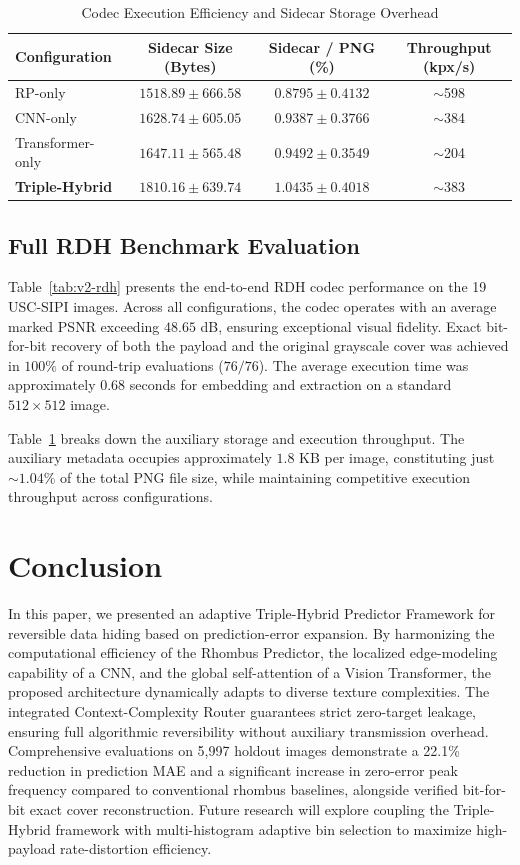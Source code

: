 \documentclass[conference]{IEEEtran}
\begin{document}
\begin{table}[!t]
\centering
\caption{Codec Execution Efficiency and Sidecar Storage Overhead}
\label{tab:overhead}
\footnotesize
\setlength{\tabcolsep}{5pt}
\begin{tabular}{lccc}
\toprule
\textbf{Configuration} & \textbf{Sidecar Size (Bytes)} & \textbf{Sidecar / PNG (\%)} & \textbf{Throughput (kpx/s)} \\
\midrule
RP-only & $1518.89 \pm 666.58$ & $0.8795 \pm 0.4132$ & $\sim$598 \\
CNN-only & $1628.74 \pm 605.05$ & $0.9387 \pm 0.3766$ & $\sim$384 \\
Transformer-only & $1647.11 \pm 565.48$ & $0.9492 \pm 0.3549$ & $\sim$204 \\
\textbf{Triple-Hybrid} & $1810.16 \pm 639.74$ & $1.0435 \pm 0.4018$ & $\sim$383 \\
\bottomrule
\end{tabular}
\end{table}

\subsection{Full RDH Benchmark Evaluation}
Table~\ref{tab:v2-rdh} presents the end-to-end RDH codec performance on the 19 USC-SIPI images. Across all configurations, the codec operates with an average marked PSNR exceeding $48.65$ dB, ensuring exceptional visual fidelity. Exact bit-for-bit recovery of both the payload and the original grayscale cover was achieved in $100\%$ of round-trip evaluations ($76/76$). The average execution time was approximately $0.68$ seconds for embedding and extraction on a standard $512 \times 512$ image.

Table~\ref{tab:overhead} breaks down the auxiliary storage and execution throughput. The auxiliary metadata occupies approximately $1.8$ KB per image, constituting just $\sim 1.04\%$ of the total PNG file size, while maintaining competitive execution throughput across configurations.

\section{Conclusion}
\label{sec:conclusion}
In this paper, we presented an adaptive Triple-Hybrid Predictor Framework for reversible data hiding based on prediction-error expansion. By harmonizing the computational efficiency of the Rhombus Predictor, the localized edge-modeling capability of a CNN, and the global self-attention of a Vision Transformer, the proposed architecture dynamically adapts to diverse texture complexities. The integrated Context-Complexity Router guarantees strict zero-target leakage, ensuring full algorithmic reversibility without auxiliary transmission overhead. Comprehensive evaluations on 5,997 holdout images demonstrate a 22.1\% reduction in prediction MAE and a significant increase in zero-error peak frequency compared to conventional rhombus baselines, alongside verified bit-for-bit exact cover reconstruction. Future research will explore coupling the Triple-Hybrid framework with multi-histogram adaptive bin selection to maximize high-payload rate-distortion efficiency.



\end{document}
